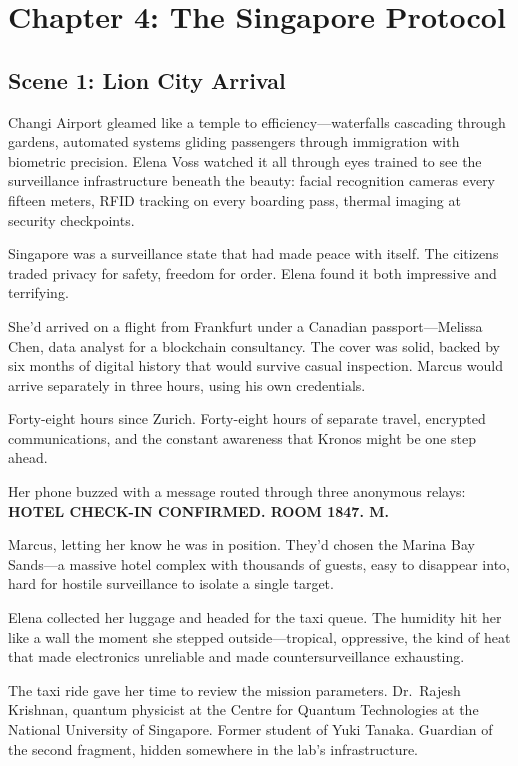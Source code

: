 \hypertarget{chapter-4-the-singapore-protocol}{%
\section{Chapter 4: The Singapore
Protocol}\label{chapter-4-the-singapore-protocol}}

\hypertarget{scene-1-lion-city-arrival}{%
\subsection{Scene 1: Lion City
Arrival}\label{scene-1-lion-city-arrival}}

Changi Airport gleamed like a temple to efficiency---waterfalls
cascading through gardens, automated systems gliding passengers through
immigration with biometric precision. Elena Voss watched it all through
eyes trained to see the surveillance infrastructure beneath the beauty:
facial recognition cameras every fifteen meters, RFID tracking on every
boarding pass, thermal imaging at security checkpoints.

Singapore was a surveillance state that had made peace with itself. The
citizens traded privacy for safety, freedom for order. Elena found it
both impressive and terrifying.

She'd arrived on a flight from Frankfurt under a Canadian
passport---Melissa Chen, data analyst for a blockchain consultancy. The
cover was solid, backed by six months of digital history that would
survive casual inspection. Marcus would arrive separately in three
hours, using his own credentials.

Forty-eight hours since Zurich. Forty-eight hours of separate travel,
encrypted communications, and the constant awareness that Kronos might
be one step ahead.

Her phone buzzed with a message routed through three anonymous relays:
\textbf{HOTEL CHECK-IN CONFIRMED. ROOM 1847. M.}

Marcus, letting her know he was in position. They'd chosen the Marina
Bay Sands---a massive hotel complex with thousands of guests, easy to
disappear into, hard for hostile surveillance to isolate a single
target.

Elena collected her luggage and headed for the taxi queue. The humidity
hit her like a wall the moment she stepped outside---tropical,
oppressive, the kind of heat that made electronics unreliable and made
countersurveillance exhausting.

The taxi ride gave her time to review the mission parameters. Dr.~Rajesh
Krishnan, quantum physicist at the Centre for Quantum Technologies at
the National University of Singapore. Former student of Yuki Tanaka.
Guardian of the second fragment, hidden somewhere in the lab's
infrastructure.

